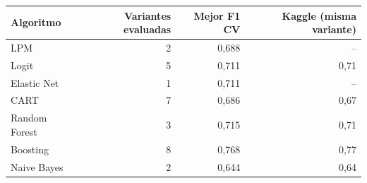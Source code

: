 
\begin{tabular}{lrrr}
\toprule
Algoritmo & Variantes evaluadas & Mejor F1 CV & Kaggle (misma variante)\\
\midrule
LPM & 2 & 0,688 & --\\
Logit & 5 & 0,711 & 0,71\\
Elastic Net & 1 & 0,711 & --\\
CART & 7 & 0,686 & 0,67\\
Random Forest & 3 & 0,715 & 0,71\\
Boosting & 8 & 0,768 & 0,77\\
Naive Bayes & 2 & 0,644 & 0,64\\
\bottomrule
\end{tabular}

